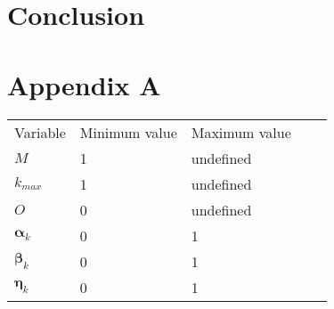 \documentclass[runningheads]{llncs}
\begin{document}



\section{Conclusion}


\section*{Appendix A}
\label{AppA}
\begin{table}[]
\begin{tabular}{|l|l|l|ll}
\cline{1-3}
Variable & Minimum value & Maximum value &  &  \\  \cline{1-3}
$M$  & 1   & undefined   &  &  \\  \cline{1-3}
$ k_{max} $ & 1 & undefined &  &  \\  \cline{1-3}
$ O $   & 0    & undefined &  &   \\  \cline{1-3}
$ \boldsymbol{\alpha}_k $ &  0 & 1 &  &  \\  \cline{1-3}
$ \boldsymbol{\beta}_k $ & 0 & 1 &  &  \\  \cline{1-3}
$ \boldsymbol{\eta}_k $ & 0 & 1 &  & \\  \cline{1-3}
\end{tabular}
\end{table}
\end{document}

